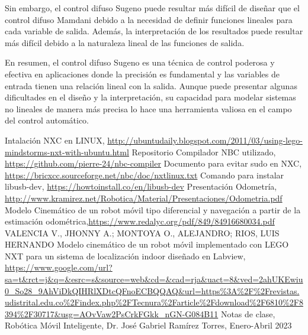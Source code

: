 \documentclass[oneside,onecolumn]{article}
\begin{document}
Sin embargo, el control difuso Sugeno puede resultar más difícil de diseñar que el control difuso Mamdani debido a la necesidad de definir funciones lineales para cada variable de salida. Además, la interpretación de los resultados puede resultar más difícil debido a la naturaleza lineal de las funciones de salida.

En resumen, el control difuso Sugeno es una técnica de control poderosa y efectiva en aplicaciones donde la precisión es fundamental y las variables de entrada tienen una relación lineal con la salida. Aunque puede presentar algunas dificultades en el diseño y la interpretación, su capacidad para modelar sistemas no lineales de manera más precisa lo hace una herramienta valiosa en el campo del control automático.



\begin{thebibliography}{2} %

 Intalación NXC en LINUX, \url{http://ubuntudaily.blogspot.com/2011/03/using-lego-mindstorms-nxt-with-ubuntu.html}
 Repositorio Compilador NBC utilizado, \url{https://github.com/pierre-24/nbc-compiler}
 Documento para evitar sudo en NXC, \url{https://bricxcc.sourceforge.net/nbc/doc/nxtlinux.txt}
 Comando para instalar libusb-dev, \url{https://howtoinstall.co/en/libusb-dev}
 Presentación Odometría, \url{http://www.kramirez.net/Robotica/Material/Presentaciones/Odometria.pdf}
 Modelo Cinemático de un robot móvil tipo diferencial y navegación a partir de la estimación odométrica,\url{https://www.redalyc.org/pdf/849/84916680034.pdf} VALENCIA V., JHONNY A.; MONTOYA O., ALEJANDRO; RIOS, LUIS HERNANDO
 Modelo cinemático de un robot móvil implementado con LEGO NXT para un sistema de localización indoor diseñado en Labview, \url{https://www.google.com/url?sa=t&rct=j&q=&esrc=s&source=web&cd=&cad=rja&uact=8&ved=2ahUKEwiu0_So28_9AhViDkQIHRlXDtcQFnoECBQQAQ&url=https%3A%2F%2Frevistas.udistrital.edu.co%2Findex.php%2FTecnura%2Farticle%2Fdownload%2F6810%2F8394%2F30717&usg=AOvVaw2PsCrkFGkk_nGN-G084B11}
 Notas de clase, Robótica Móvil Inteligente, Dr. José Gabriel Ramírez Torres, Enero-Abril 2023  
\end{thebibliography}

\end{document}
